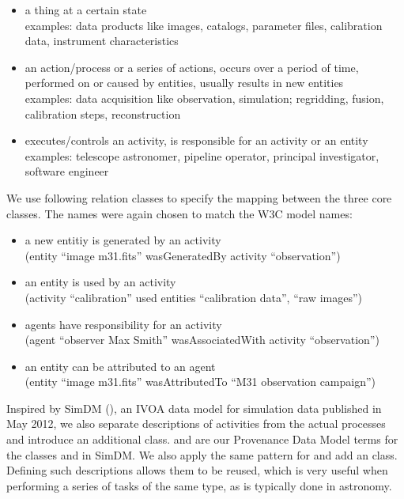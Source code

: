 \begin{itemize}
\item {} a thing at a certain state\\
    examples: data products like images, catalogs, parameter files, calibration data, instrument characteristics

\item {} an action/process or a series of actions, occurs over a period of time, performed on or caused by entities, usually results in new entities\\
    examples: data acquisition like observation, simulation; regridding, fusion, calibration steps, reconstruction

\item {} executes/controls an activity, is responsible for an activity or an entity\\
    examples: telescope astronomer, pipeline operator, principal investigator, software engineer

\end{itemize}

\noindent

We use following relation classes to specify the mapping between the three core 
classes. The names were again chosen to match the W3C model names:
\begin{itemize}
\item {} a new entitiy is generated by an activity\\
        (entity ``image m31.fits'' wasGeneratedBy activity ``observation'')
\item {} an entity is used by an activity\\
        (activity ``calibration'' used entities ``calibration data'', ``raw images'')
\item {} agents have responsibility for an activity\\
        (agent ``observer Max Smith'' wasAssociatedWith activity ``observation'')
\item {} an entity can be attributed to an agent\\
		(entity ``image m31.fits'' wasAttributedTo ``M31 observation campaign'')
\end{itemize}


Inspired by SimDM (\cite{std:SimDM}), an IVOA  data model for simulation data 
published in May 2012, we also separate descriptions of activities from the 
actual processes and introduce an additional  class.
 and  are our Provenance Data Model 
terms for the classes  and  in SimDM. 
We also apply the same pattern for  and add an 
class.
Defining such descriptions allows them to be reused, which is very useful 
when performing a series of tasks of the same type, as is typically done in 
astronomy. 

